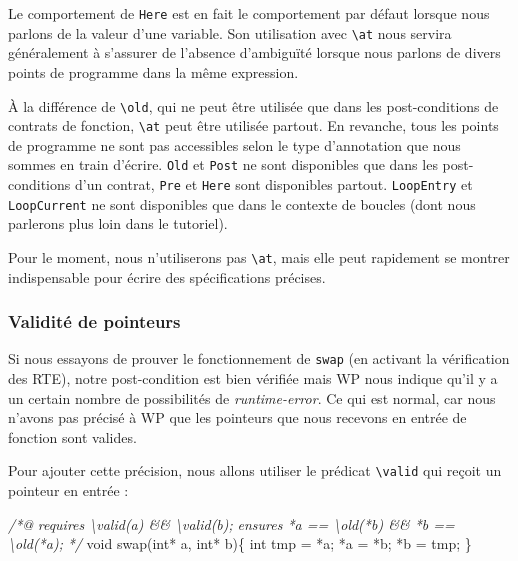 \documentclass[12pt,francais,]{scrbook}
\newenvironment{Shaded}{}{}
\newcommand{\DataTypeTok}[1]{\textcolor[rgb]{0.56,0.13,0.00}{{#1}}}
\newcommand{\CommentTok}[1]{\textcolor[rgb]{0.38,0.63,0.69}{\textit{{#1}}}}
\newcommand{\NormalTok}[1]{{#1}}
\newenvironment{zdsblock}[1]{%
  \tcolorbox[beamer,%
    noparskip,breakable,
    colback=LightBlue,colframe=DarkBlue,%
    colbacklower=DarkBlue,%
    title=#1]
}{\endtcolorbox}
\begin{document}
\begin{zdsblock}{Information}
  Le comportement de \texttt{Here} est
  en fait le comportement par défaut lorsque nous parlons de la
  valeur d'une variable. Son utilisation avec \texttt{\textbackslash{}at}
  nous servira généralement à s'assurer de l'absence
  d'ambiguïté lorsque nous parlons de divers points de
  programme dans la même expression.
\end{zdsblock}

À la différence de \texttt{\textbackslash{}old}, qui ne peut être
utilisée que dans les post-conditions de contrats de fonction,
\texttt{\textbackslash{}at} peut être utilisée partout. En revanche,
tous les points de programme ne sont pas accessibles selon le type
d'annotation que nous sommes en train d'écrire. \texttt{Old} et
\texttt{Post} ne sont disponibles que dans les post-conditions d'un
contrat, \texttt{Pre} et \texttt{Here} sont disponibles partout.
\texttt{LoopEntry} et \texttt{LoopCurrent} ne sont disponibles que dans
le contexte de boucles (dont nous parlerons plus loin dans le tutoriel).

Pour le moment, nous n'utiliserons pas \texttt{\textbackslash{}at}, mais
elle peut rapidement se montrer indispensable pour écrire des
spécifications précises.

\subsubsection{Validité de pointeurs}\label{validituxe9-de-pointeurs}

Si nous essayons de prouver le fonctionnement de \texttt{swap} (en
activant la vérification des RTE), notre post-condition est bien
vérifiée mais WP nous indique qu'il y a un certain nombre de
possibilités de \emph{runtime-error}. Ce qui est normal, car nous
n'avons pas précisé à WP que les pointeurs que nous recevons en entrée
de fonction sont valides.

Pour ajouter cette précision, nous allons utiliser le prédicat
\texttt{\textbackslash{}valid} qui reçoit un pointeur en entrée :

\begin{footnotesize}\begin{Shaded}
\begin{Highlighting}[]
\CommentTok{/*@}
\CommentTok{  requires \textbackslash{}valid(a) && \textbackslash{}valid(b);}
\CommentTok{  ensures  *a == \textbackslash{}old(*b) && *b == \textbackslash{}old(*a);}
\CommentTok{*/}
\DataTypeTok{void} \NormalTok{swap(}\DataTypeTok{int}\NormalTok{* a, }\DataTypeTok{int}\NormalTok{* b)\{}
  \DataTypeTok{int} \NormalTok{tmp = *a;}
  \NormalTok{*a = *b;}
  \NormalTok{*b = tmp;}
\NormalTok{\}}
\end{Highlighting}
\end{Shaded}\end{footnotesize}
\end{document}
